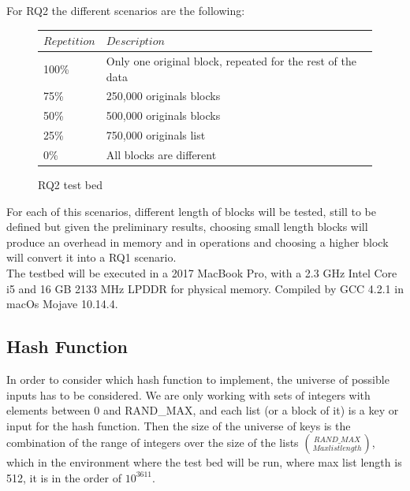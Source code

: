 \documentclass[a4paper,12pt]{article}
\begin{document}
For RQ2 the different scenarios are the following:
\\
\begin{figure}[H]
\centering
\begin{tabular}{|l|l|} \toprule
	{$Repetition $} & {$Description$}  \\ \midrule
	100\% & Only one  original block, repeated for the rest of the data \\
	75\% & 250,000 originals blocks   \\
	50\% & 500,000 originals blocks \\
	25\% & 750,000 originals list \\
	0\% & All blocks are different \\ \midrule
\end{tabular}
\caption{RQ2 test bed}
\end{figure}

For each of this scenarios, different length of blocks will be tested, still to be defined but given the preliminary results, choosing small length blocks will produce an overhead in memory and in operations and choosing a higher block will convert it into a RQ1 scenario. \\

The testbed will be executed in a 2017 MacBook Pro, with a 2.3 GHz Intel Core i5 and 16 GB 2133 MHz LPDDR for physical memory. Compiled by GCC 4.2.1 in macOs Mojave 10.14.4.


\subsection{Hash Function}

In order to consider which hash function to implement, the universe of possible inputs has to be considered. We are only working with sets of integers with elements between 0 and RAND\_MAX, and each list (or a block of it) is a key or input for the hash function. 
Then the size of the universe of keys is the combination of the range of integers over the size of the lists $\binom{RAND\_MAX}{Max list length} $, which in the environment where the test bed will be run, where max list length is 512, it is in the order of $10^{3611}$.
\end{document}
